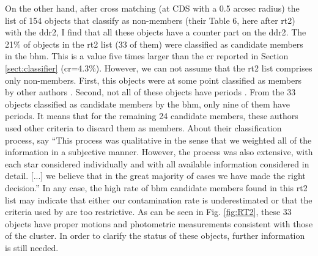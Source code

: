 On the other hand, after cross matching (at CDS with a 0.5 arcsec radius)  the list of 154 objects that \citet{Rebull2016} classify as non-members (their Table 6, here after \gls{rt2}) with the \gls{ddr2}, I find that all these objects have a counter part on the \gls{ddr2}. The 21\% of objects in the \gls{rt2} list (33 of them) were classified as candidate members in the \gls{bhm}. This is a value five times larger than the \gls{cr} reported in Section \ref{sect:classifier} (\gls{cr}=4.3\%). However, we can not assume that the \gls{rt2} list comprises only non-members. First, this objects were at some point classified as members by other authors \cite[Appendix B of][]{Rebull2016}. Second, not all of these objects have periods \cite[only 20\% according to][]{Rebull2016}. From the 33 objects classified as candidate members by the \gls{bhm}, only nine of them have periods. It means that for the remaining 24 candidate members, these authors used other criteria to discard them as members. About their classification process, \citet{Rebull2016} say ``This process was qualitative in the sense that we weighted all of the information in a subjective manner. However, the process was also extensive, with each star considered individually and with all available information considered in detail. [...] we believe that in the great majority of cases we have made the right decision.'' In any case, the high rate of \gls{bhm} candidate members found in this \gls{rt2} list may indicate that either our contamination rate is underestimated or that the criteria used by \citet{Rebull2016} are too restrictive. As can be seen in Fig. \ref{fig:RT2}, these 33 objects have proper motions and photometric measurements consistent with those of the cluster. In order to clarify the status of these objects, further information is still needed.

